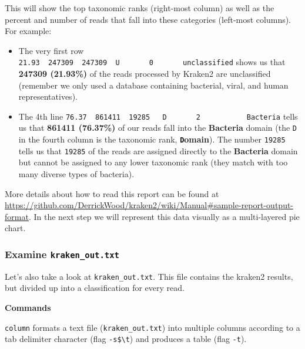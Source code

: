\documentclass[
]{book}
\newenvironment{Shaded}{\begin{snugshade}}{\end{snugshade}}
\newcommand{\AttributeTok}[1]{\textcolor[rgb]{0.13,0.29,0.53}{#1}}
\newcommand{\DataTypeTok}[1]{\textcolor[rgb]{0.13,0.29,0.53}{#1}}
\newcommand{\ExtensionTok}[1]{#1}
\newcommand{\FunctionTok}[1]{\textcolor[rgb]{0.13,0.29,0.53}{\textbf{#1}}}
\newcommand{\KeywordTok}[1]{\textcolor[rgb]{0.13,0.29,0.53}{\textbf{#1}}}
\newcommand{\NormalTok}[1]{#1}
\newcommand{\StringTok}[1]{\textcolor[rgb]{0.31,0.60,0.02}{#1}}
\providecommand{\tightlist}{%
  \setlength{\itemsep}{0pt}\setlength{\parskip}{0pt}}
\begin{document}
This will show the top taxonomic ranks (right-most column) as well as the percent and number of reads that fall into these categories (left-most columns). For example:

\begin{itemize}
\tightlist
\item
  The very first row \texttt{21.93\ \ 247309\ \ 247309\ \ U\ \ \ \ \ \ \ 0\ \ \ \ \ \ \ unclassified} shows us that \textbf{247309 (21.93\%)} of the reads processed by Kraken2 are unclassified (remember we only used a database containing bacterial, viral, and human representatives).
\item
  The 4th line \texttt{76.37\ \ 861411\ \ 19285\ \ \ D\ \ \ \ \ \ \ 2\ \ \ \ \ \ \ \ \ \ \ Bacteria} tells us that \textbf{861411 (76.37\%)} of our reads fall into the \textbf{Bacteria} domain (the \texttt{D} in the fourth column is the taxonomic rank, \textbf{\texttt{D}omain}). The number \texttt{19285} tells us that \texttt{19285} of the reads are assigned directly to the \textbf{Bacteria} domain but cannot be assigned to any lower taxonomic rank (they match with too many diverse types of bacteria).
\end{itemize}

More details about how to read this report can be found at \url{https://github.com/DerrickWood/kraken2/wiki/Manual\#sample-report-output-format}. In the next step we will represent this data visually as a multi-layered pie chart.

\subsubsection{\texorpdfstring{Examine \texttt{kraken\_out.txt}}{Examine kraken\_out.txt}}\label{examine-kraken_out.txt}

Let's also take a look at \texttt{kraken\_out.txt}. This file contains the kraken2 results, but divided up into a classification for every read.

\textbf{Commands}

\begin{Shaded}
\end{Shaded}

\texttt{column} formats a text file (\texttt{kraken\_out.txt}) into multiple columns according to a tab delimiter character (flag \texttt{-s\textquotesingle{}\$\textbackslash{}t\textquotesingle{}}) and produces a table (flag \texttt{-t}).
\end{document}

